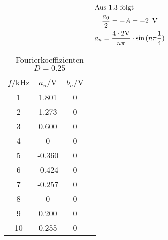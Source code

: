 \documentclass[a4paper, 12pt]{article}
\begin{document}
\subsection{}

\begin{gather*}
  \intertext{Aus 1.3 folgt}
  \frac{a_0}{2} = -A = -2 \,\ \si{\volt}\\
  a_n = \frac{4 \cdot 2 \si{\volt}}{ n \pi } \cdot \sin{(n \pi \frac{1}{4})}
\end{gather*}

\begin{table}[H]
\begin{center}
\begin{tabular}{@{}cccc@{}}
\toprule
$f/\si{\kilo\hertz}$ & $a_n / \si{\volt}$ & $b_n / \si{\volt}$ \\ \midrule
1                      &  1.801     & 0     \\
2                      &  1.273     & 0     \\
3                      &  0.600     & 0     \\
4                      &  0     & 0     \\
5                      &  -0.360     & 0     \\
6                      &  -0.424     & 0     \\
7                      &  -0.257     & 0     \\
8                      &  0    & 0     \\
9                      &  0.200     & 0     \\
10                     &  0.255    & 0     \\ \bottomrule
\end{tabular}
\end{center}
\caption{Fourierkoeffizienten $D = 0.25$}
\end{table}
\end{document}
